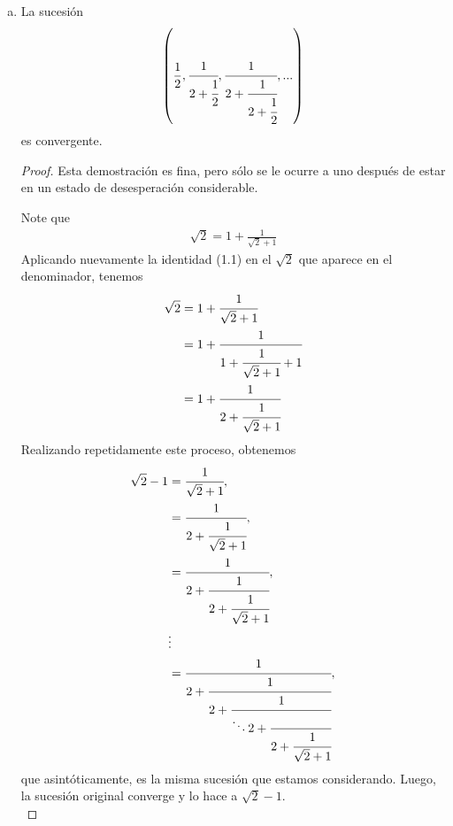 \begin{itemize}[leftmargin=*]
\begin{enumerate}[a)]
        \begin{proof}
            Sea  $\tau(n)=\displaystyle\sum_{j\mid n}1$, en efecto $0\leq  v(n)\leq\tau(n)$, para todo $n\in \Z^+$, ahora note que $\tau(n)\leq 2\sqrt{n}$, ya que para cada divisor de $n$ menor igual que $\sqrt{n}$ hay exactamente un divisor mayor igual que $\sqrt{n}$, es decir, si $j\mid n$ y $j\leq \sqrt{n}$, entonces $\dfrac{n}{j}\geq \sqrt{n}$ y además $\dfrac{n}{j}\mid n$. Luego:

            \begin{align*}
                0\leq \lim_{n\to \infty} \dfrac{v(n)}{n}\leq \lim_{n\to\infty}\dfrac{2\sqrt{n}}{n}=0
            \end{align*}
        \end{proof}
        
        \item La sucesión
        \begin{align*}
            \left(\frac{1}{2},\cfrac{1}{2+\cfrac{1}{2}},\cfrac{1}{2+\cfrac{1}{2+\cfrac{1}{2}}},...\right)
        \end{align*}
        es convergente.\\

        \begin{proof}
            Esta demostración es fina, pero sólo se le ocurre a uno después de estar en un estado de desesperación considerable.
            
            Note que
            \begin{align}
                \sqrt{2}=1+\frac{1}{\sqrt{2}+1}
            \end{align}
            Aplicando nuevamente la identidad (1.1) en el $\sqrt{2}$ que aparece en el denominador, tenemos
            \begin{align*}
                \sqrt{2}&=1+\cfrac{1}{\sqrt{2}+1}\\
                &=1+\cfrac{1}{1+\cfrac{1}{\sqrt{2}+1}+1}\\
                &=1+\cfrac{1}{2+\cfrac{1}{\sqrt{2}+1}}
            \end{align*}
            Realizando repetidamente este proceso, obtenemos
            \begin{align*}
                \sqrt{2}-1&=\cfrac{1}{\sqrt{2}+1},\\
                &=\cfrac{1}{2+\cfrac{1}{\sqrt{2}+1}},\\
                &=\cfrac{1}{2+\cfrac{1}{2+\cfrac{1}{\sqrt{2}+1}}},\\
                &\vdots\\
                &=\cfrac{1}{2+\cfrac{1}{2+\cfrac{1}{\ddots 2+ \cfrac{\empty}{2+\cfrac{1}{\sqrt{2}+1}}}}},
            \end{align*}
            que asintóticamente, es la misma sucesión que estamos considerando. Luego, la sucesión original converge y lo hace a $\sqrt{2}-1$.\\
        \end{proof}


\end{enumerate}
\end{itemize}
